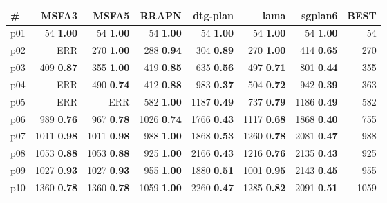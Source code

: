 \begin{tabular}{|l|rrrrrr|r|}
\hline
\textbf{\#} & \textbf{MSFA3} & \textbf{MSFA5} & \textbf{RRAPN} & \textbf{dtg-plan} & \textbf{lama} & \textbf{sgplan6} & \textbf{BEST}\\
\hline
p01 & {\footnotesize 54} \textbf{1.00} & {\footnotesize 54} \textbf{1.00} & {\footnotesize 54} \textbf{1.00} & {\footnotesize 54} \textbf{1.00} & {\footnotesize 54} \textbf{1.00} & {\footnotesize 54} \textbf{1.00} & 54\\
p02 & ERR & {\footnotesize 270} \textbf{1.00} & {\footnotesize 288} \textbf{0.94} & {\footnotesize 304} \textbf{0.89} & {\footnotesize 270} \textbf{1.00} & {\footnotesize 414} \textbf{0.65} & 270\\
p03 & {\footnotesize 409} \textbf{0.87} & {\footnotesize 355} \textbf{1.00} & {\footnotesize 419} \textbf{0.85} & {\footnotesize 635} \textbf{0.56} & {\footnotesize 497} \textbf{0.71} & {\footnotesize 801} \textbf{0.44} & 355\\
p04 & ERR & {\footnotesize 490} \textbf{0.74} & {\footnotesize 412} \textbf{0.88} & {\footnotesize 983} \textbf{0.37} & {\footnotesize 504} \textbf{0.72} & {\footnotesize 942} \textbf{0.39} & 363\\
p05 & ERR & ERR & {\footnotesize 582} \textbf{1.00} & {\footnotesize 1187} \textbf{0.49} & {\footnotesize 737} \textbf{0.79} & {\footnotesize 1186} \textbf{0.49} & 582\\
p06 & {\footnotesize 989} \textbf{0.76} & {\footnotesize 967} \textbf{0.78} & {\footnotesize 1026} \textbf{0.74} & {\footnotesize 1766} \textbf{0.43} & {\footnotesize 1117} \textbf{0.68} & {\footnotesize 1868} \textbf{0.40} & 755\\
p07 & {\footnotesize 1011} \textbf{0.98} & {\footnotesize 1011} \textbf{0.98} & {\footnotesize 988} \textbf{1.00} & {\footnotesize 1868} \textbf{0.53} & {\footnotesize 1260} \textbf{0.78} & {\footnotesize 2081} \textbf{0.47} & 988\\
p08 & {\footnotesize 1053} \textbf{0.88} & {\footnotesize 1053} \textbf{0.88} & {\footnotesize 925} \textbf{1.00} & {\footnotesize 2166} \textbf{0.43} & {\footnotesize 1216} \textbf{0.76} & {\footnotesize 2135} \textbf{0.43} & 925\\
p09 & {\footnotesize 1027} \textbf{0.93} & {\footnotesize 1027} \textbf{0.93} & {\footnotesize 955} \textbf{1.00} & {\footnotesize 1880} \textbf{0.51} & {\footnotesize 1001} \textbf{0.95} & {\footnotesize 2143} \textbf{0.45} & 955\\
p10 & {\footnotesize 1360} \textbf{0.78} & {\footnotesize 1360} \textbf{0.78} & {\footnotesize 1059} \textbf{1.00} & {\footnotesize 2260} \textbf{0.47} & {\footnotesize 1285} \textbf{0.82} & {\footnotesize 2091} \textbf{0.51} & 1059\\

\end{tabular}
